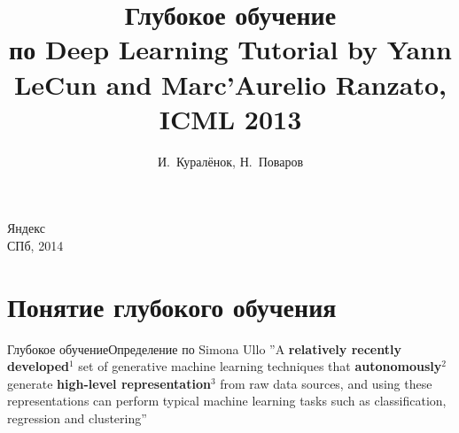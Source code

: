 \documentclass[14pt, fleqn, xcolor={dvipsnames, table}]{beamer}
\title{Глубокое обучение\\\small{по Deep Learning Tutorial by Yann LeCun and Marc'Aurelio Ranzato, ICML 2013}}
\author[]{\small{%
И.~Куралёнок,
Н.~Поваров}}
\date{}
\begin{document}
\begin{frame}
\maketitle
\small
\begin{center}
\vspace{-60pt}
\normalsize {\color{red}Я}ндекс \\
\vspace{80pt}
\footnotesize СПб, 2014
\end{center}
\end{frame}
\section{Понятие глубокого обучения} %

\begin{frame}{Глубокое обучение}{Определение по Simona Ullo}
\small
''A \textbf{relatively recently developed}$^1$ set of generative machine learning techniques that \textbf{autonomously}$^2$ generate \textbf{high-level representation}$^3$ from raw data sources, and using these representations can perform typical machine learning tasks such as classification, regression and clustering''\\ 
\begin{enumerate}
\end{enumerate}
\end{frame}
 
\end{document}
